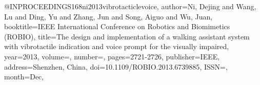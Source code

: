 @INPROCEEDINGS{168ni2013vibrotacticlevoice,
author={Ni, Dejing and Wang, Lu and Ding, Yu and Zhang, Jun and Song, Aiguo and Wu, Juan},
booktitle={IEEE International Conference on Robotics and Biomimetics (ROBIO)}, 
title={The design and implementation of a walking assistant system with vibrotactile indication and voice prompt for the visually impaired}, 
year={2013},
volume={},
number={},
pages={2721-2726},
publisher={IEEE},
address={Shenzhen, China},
doi={10.1109/ROBIO.2013.6739885},
ISSN={},
month={Dec},}
